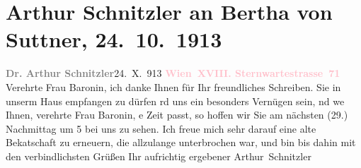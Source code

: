 

               \section[Arthur Schnitzler an Bertha von Suttner, 24. 10. 1913]{ Arthur Schnitzler an Bertha von Suttner,
                    24. 10. 1913}\nopagebreak{}\rehead{ }\normalsize\beginnumbering{} \toendnotes[C]{\smallbreak\pagebreak[2]} 
\toendnotes[C]{\smallbreak}\pstart
           \noindent{}{\pb}\textcolor{gray}{\textbf{Dr. Arthur Schnitzler}}\hfill 24. X. 913\pend
           \pstart
           \textcolor{gray}{\textbf{\textcolor{pink}{Wien XVIII. Sternwartestrasse 71}{}\ledrightnote{\textcolor{pink}{Sternwartestraße}}}}\pend
           \pstart{}Verehrte Frau Baronin,\pend\pstart
           ich danke Ihnen für Ihr freundliches Schreiben. Sie in unserm Haus empfangen zu
                    dürfen rd uns ein besonders Vernügen sein, nd we{\geminationn} Ihnen, verehrte Frau Baronin,
                        e Zeit passt, so hoffen wir Sie {\pb}am \introOben{}nächsten\introOben{}{ }\label{K_L02154_1v}\label{K_L02154_1h}{ }\introOben{}(29.)\introOben{} Nachmittag um 5 bei uns
                    zu sehen.\pend
           \pstart
           Ich freue mich sehr darauf eine alte Beka{\geminationn}tschaft zu
                    erneuern, die allzulange unterbrochen war, und bin bis dahin mit den
                    verbindlichsten Grüßen Ihr aufrichtig ergebener\pend
           \pstart \spacefill\mbox{Arthur Schnitzler}\pend{}\endnumbering{}  
      